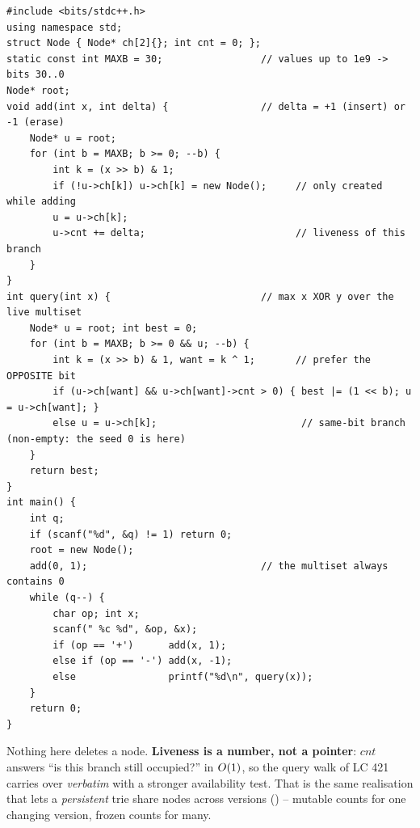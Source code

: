 \begin{lstlisting}[caption={Vasiliy's Multiset -- a counted dynamic binary trie: add/erase bump cnt, query runs the complement greedy gated on cnt>0 (Codeforces 706D; O(q log C))}, label={lst:c08-summit}]
#include <bits/stdc++.h>
using namespace std;
struct Node { Node* ch[2]{}; int cnt = 0; };
static const int MAXB = 30;                 // values up to 1e9 -> bits 30..0
Node* root;
void add(int x, int delta) {                // delta = +1 (insert) or -1 (erase)
    Node* u = root;
    for (int b = MAXB; b >= 0; --b) {
        int k = (x >> b) & 1;
        if (!u->ch[k]) u->ch[k] = new Node();     // only created while adding
        u = u->ch[k];
        u->cnt += delta;                          // liveness of this branch
    }
}
int query(int x) {                          // max x XOR y over the live multiset
    Node* u = root; int best = 0;
    for (int b = MAXB; b >= 0 && u; --b) {
        int k = (x >> b) & 1, want = k ^ 1;       // prefer the OPPOSITE bit
        if (u->ch[want] && u->ch[want]->cnt > 0) { best |= (1 << b); u = u->ch[want]; }
        else u = u->ch[k];                         // same-bit branch (non-empty: the seed 0 is here)
    }
    return best;
}
int main() {
    int q;
    if (scanf("%d", &q) != 1) return 0;
    root = new Node();
    add(0, 1);                              // the multiset always contains 0
    while (q--) {
        char op; int x;
        scanf(" %c %d", &op, &x);
        if (op == '+')      add(x, 1);
        else if (op == '-') add(x, -1);
        else                printf("%d\n", query(x));
    }
    return 0;
}
\end{lstlisting}
\begin{notebox}
Nothing here deletes a node. \textbf{Liveness is a number, not a pointer}: $\mathit{cnt}$ answers ``is this
branch still occupied?'' in $O(1)$, so the query walk of LC 421 carries over \emph{verbatim} with a
stronger availability test. That is the same realisation that lets a \emph{persistent} trie share nodes
across versions () -- mutable counts for one changing version, frozen counts for many.
\end{notebox}

